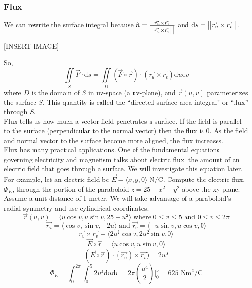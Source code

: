 \subsubsection{Flux}
\noindent
We can rewrite the surface integral because $\hat{n} = \frac{\vec{r_u} \times \vec{r_v}}{\big\lvert \big\lvert \vec{r_u} \times \vec{r_v} \big\rvert \big\rvert}$ and $\mathrm{d}s = \big\lvert \big\lvert \vec{r_u} \times \vec{r_v} \big\rvert \big\rvert$.

[INSERT IMAGE]

\noindent
So,
\begin{equation*}
	\iint\limits_{S}{\vec{F} \cdot \mathrm{d}s} = \iint\limits_{D}{\left(\vec{F}\circ\vec{r}\right) \cdot \left(\vec{r_u} \times \vec{r_v}\right)\mathrm{d}u\mathrm{d}v}
\end{equation*}
where $D$ is the domain of $S$ in uv-space (a uv-plane), and $\vec{r}(u,v)$ parameterizes the surface $S$. This quantity is called the ``directed surface area integral'' or ``flux'' through $S$.\\

\noindent
Flux tells us how much a vector field penetrates a surface. If the field is parallel to the surface (perpendicular to the normal vector) then the flux is 0. As the field and normal vector to the surface become more aligned, the flux increases. \\

\noindent
Flux has many practical applications. One of the fundamental equations governing electricity and magnetism talks about electric flux: the amount of an electric field that goes through a surface. We will investigate this equation later.\\

\noindent
For example, let an electric field be $\vec{E} = \langle x, y, 0 \rangle \text{ N}/ \text{C}$. Compute the electric flux, $\Phi_{E}$, through the portion of the paraboloid $z=25-x^2-y^2$ above the xy-plane. Assume a unit distance of 1 meter.
\indent
We will take advantage of a paraboloid's radial symmetry and use cylindrical coordinates.
\begin{equation*}
	\vec{r}(u,v) = \langle u\cos{v}, u\sin{v}, 25 - u^2 \rangle \text{ where } 0 \leq u \leq 5 \text{ and } 0 \leq v \leq 2\pi\end{equation*}
\begin{equation*}
	\vec{r_u} = \langle \cos{v}, \sin{v}, -2u \rangle \text{ and } \vec{r_v}=\langle -u\sin{v}, u\cos{v}, 0 \rangle
\end{equation*}
\begin{equation*}
	\vec{r_u} \times \vec{r_v} = \langle 2u^2\cos{v}, 2u^2\sin{v}, 0 \rangle
\end{equation*}
\begin{equation*}
	\vec{E}\circ\vec{r} = \langle u\cos{v}, u\sin{v}, 0 \rangle
\end{equation*}
\begin{equation*}
	\left(\vec{E}\circ\vec{r}\right) \cdot (\vec{r_u}) \times \vec{r_v}) = 2u^3
\end{equation*}
\begin{equation*}
	\Phi_{E} = \int_{0}^{2\pi}{\int_{0}^{5}{2u^3\mathrm{d}u}\mathrm{d}v} = 2\pi\left(\frac{u^4}{2}\right)\rvert_{0}^{5} = 625\text{ Nm}^2/\text{C}
\end{equation*}